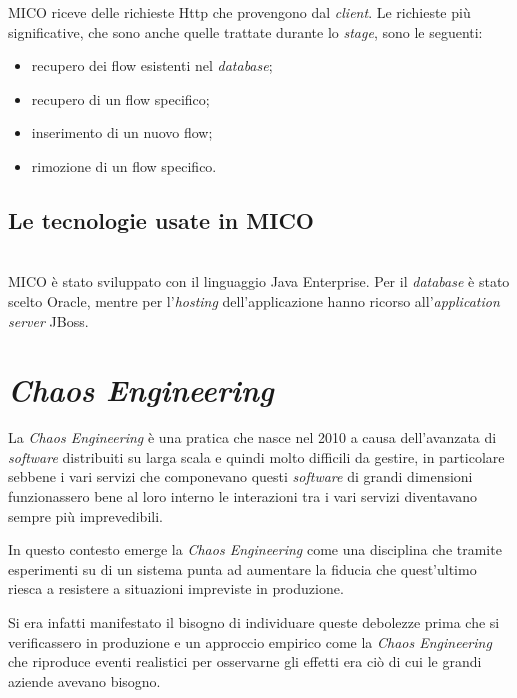 MICO riceve delle richieste Http che provengono dal \textit{client}.
Le richieste più significative, che sono anche quelle trattate durante lo \textit{stage}, sono le seguenti:
\begin{itemize}
    \item recupero dei flow esistenti nel \textit{database};
    \item recupero di un flow specifico;
    \item inserimento di un nuovo flow;
    \item rimozione di un flow specifico.
\end{itemize}

\subsection{Le tecnologie usate in MICO}\mbox{}\\
MICO è stato sviluppato con il linguaggio Java Enterprise.
Per il \textit{database} è stato scelto Oracle, mentre per l'\textit{hosting} dell'applicazione hanno ricorso all'\textit{application server} JBoss.

\section{\textit{Chaos Engineering}}
La \textit{Chaos Engineering} è una pratica che nasce nel 2010 a causa dell'avanzata di \textit{software} distribuiti su larga scala e quindi molto difficili da gestire, in particolare sebbene i vari servizi che componevano questi \textit{software} di grandi dimensioni funzionassero bene al loro interno le interazioni tra i vari servizi diventavano sempre più imprevedibili.

In questo contesto emerge la \textit{Chaos Engineering} come una disciplina che tramite esperimenti su di un sistema punta ad aumentare la fiducia che quest'ultimo riesca a resistere a situazioni impreviste in produzione.

Si era infatti manifestato il bisogno di individuare queste debolezze prima che si verificassero in produzione e un approccio empirico come la \textit{Chaos Engineering} che riproduce eventi realistici per osservarne gli effetti era ciò di cui le grandi aziende avevano bisogno.

